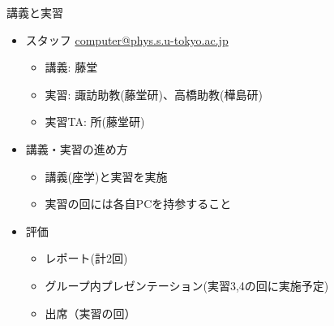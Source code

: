 \begin{frame}[t,fragile]{講義と実習}
  \begin{itemize}
  \item スタッフ \href{mailto:computer@phys.s.u-tokyo.ac.jp}{computer@phys.s.u-tokyo.ac.jp}
    \begin{itemize}
    \item 講義: 藤堂
    \item 実習: 諏訪助教(藤堂研)、高橋助教(樺島研)
    \item 実習TA: 所(藤堂研)
    \end{itemize}
  \item 講義・実習の進め方
    \begin{itemize}
    \item 講義(座学)と実習を実施
    \item 実習の回には各自PCを持参すること
    \end{itemize}
  \item 評価
    \begin{itemize}
    \item レポート(計2回)
    \item グループ内プレゼンテーション(実習3,4の回に実施予定)
    \item 出席（実習の回）
    \end{itemize}    
  \end{itemize}
\end{frame}
